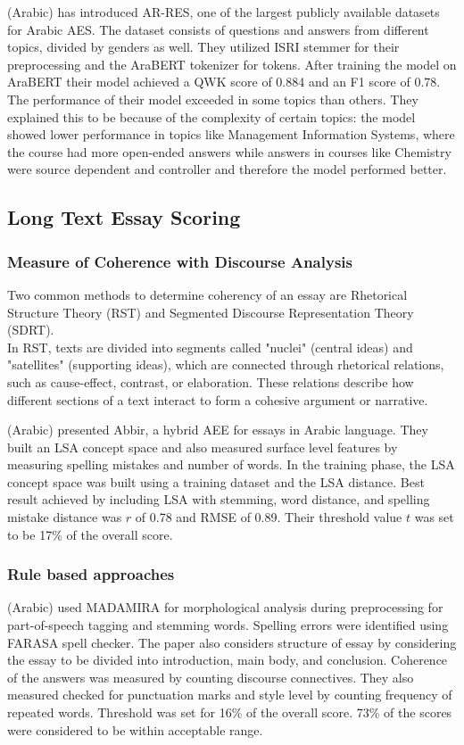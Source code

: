 \documentclass{article}
\begin{document}
	
	\textbf{\textcite{23_ghazawi2024bert}} (Arabic) has introduced AR-RES, one of the largest publicly available datasets for Arabic AES. The dataset consists of questions and answers from different topics, divided by genders as well. They utilized ISRI stemmer for their preprocessing and the AraBERT tokenizer for tokens. After training the model on AraBERT their model achieved a QWK score of 0.884 and an F1 score of 0.78. The performance of their model exceeded in some topics than others. They explained this to be because of the complexity of certain topics: the model showed lower performance in topics like Management Information Systems, where the course had more open-ended answers while answers in courses like Chemistry were source dependent and controller and therefore the model performed better. 
	
	\subsection{Long Text Essay Scoring}
	\subsubsection*{Measure of Coherence with Discourse Analysis}
	Two common methods to determine coherency of an essay are Rhetorical Structure Theory (RST) and Segmented Discourse Representation Theory (SDRT). \\ In RST, texts are divided into segments called "nuclei" (central ideas) and "satellites" (supporting ideas), which are connected through rhetorical relations, such as cause-effect, contrast, or elaboration. These relations describe how different sections of a text interact to form a cohesive argument or narrative. 
	
	\textbf{\textcite{6_ghamdi2014hybridarabic}} (Arabic) presented Abbir, a hybrid AEE for essays in Arabic language. They built an LSA concept space and also measured surface level features by measuring spelling mistakes and number of words. In the training phase, the LSA concept space was built using a training dataset and the LSA distance. Best result achieved by including LSA with stemming, word distance, and spelling mistake distance was $r$ of 0.78 and RMSE of 0.89. Their threshold value $t$ was set to be 17\% of the overall score. 
	
	\subsubsection*{Rule based approaches}
	\textbf{\textcite{7_qahtani2019rulebased}} (Arabic) used MADAMIRA \cite{pasha2014madamira} for morphological analysis during preprocessing for part-of-speech tagging and stemming words. Spelling errors were identified using FARASA spell checker. The paper also considers structure of essay by considering the essay to be divided into introduction, main body, and conclusion. Coherence of the answers was measured by counting discourse connectives. They also measured checked for punctuation marks and style level by counting frequency of repeated words. Threshold was set for 16\% of the overall score. 73\% of the scores were considered to be within acceptable range.
	
\end{document}
